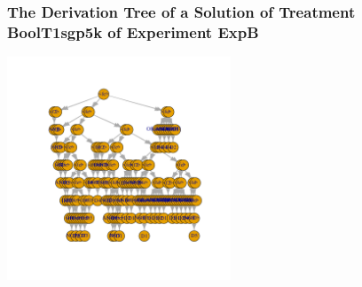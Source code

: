  \begin{frame}
 \frametitle{ The Derivation Tree of a Solution of Treatment BoolT1sgp5k of Experiment ExpB }
 \begin{center}
\includegraphics[width=0.5\textwidth, angle=0]
{ExpBDerivationTreeFigure008.pdf}
 \end{center}
 \label{report/ExpBDerivationTreeFigure008.pdf}  
 \end{frame}

